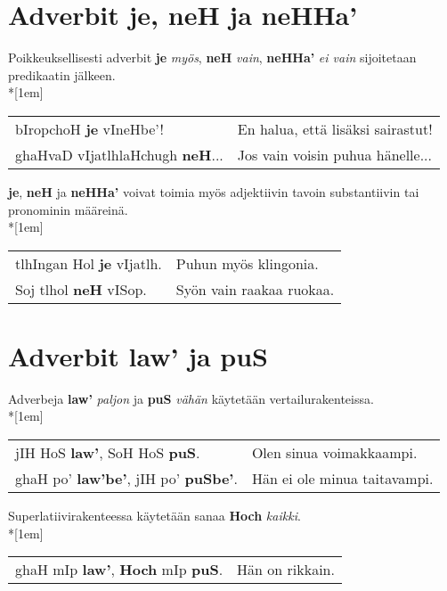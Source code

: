 \documentclass{book}
\begin{document}
\section{Adverbit je, neH ja neHHa'}

Poikkeuksellisesti adverbit \textbf{je} \textit{myös}, \textbf{neH} \textit{vain}, \textbf{neHHa'} \textit{ei vain} sijoitetaan predikaatin jälkeen.\\*[1em]
\begin{tabular}{l l}
    bIropchoH \textbf{je} vIneHbe'! & En halua, että lisäksi sairastut! \\
    ghaHvaD vIjatlhlaHchugh \textbf{neH}... & Jos vain voisin puhua hänelle... \\
\end{tabular}

\textbf{je}, \textbf{neH} ja \textbf{neHHa'} voivat toimia myös adjektiivin tavoin substantiivin tai pronominin määreinä.\\*[1em]
\begin{tabular}{l l}
    tlhIngan Hol \textbf{je} vIjatlh. & Puhun myös klingonia. \\
    Soj tlhol \textbf{neH} vISop. & Syön vain raakaa ruokaa. \\
\end{tabular}


\section{Adverbit law' ja puS}

Adverbeja \textbf{law'} \textit{paljon} ja \textbf{puS} \textit{vähän} käytetään vertailurakenteissa.
\\*[1em]
\begin{tabular}{l l}
    jIH HoS \textbf{law'}, SoH HoS \textbf{puS}. & Olen sinua voimakkaampi. \\
    ghaH po' \textbf{law'be'}, jIH po' \textbf{puSbe'}. & Hän ei ole minua taitavampi. \\
\end{tabular}

Superlatiivirakenteessa käytetään sanaa \textbf{Hoch} \textit{kaikki}.
\\*[1em]
\begin{tabular}{l l}
    ghaH mIp \textbf{law'}, \textbf{Hoch} mIp \textbf{puS}. & Hän on rikkain. \\
\end{tabular}
\end{document}

